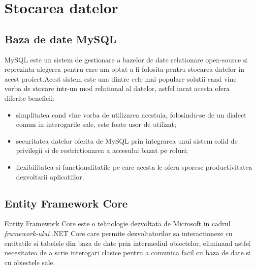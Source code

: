 \section{Stocarea datelor}

 \subsection*{Baza de date MySQL}
	MySQL este un sistem de gestionare a bazelor de date relationare open-source si reprezinta alegerea pentru care am optat a fi folosita pentru stocarea datelor in acest proiect.Acest sistem este una dintre cele mai populare solutii cand vine vorba de stocare intr-un mod relational al datelor, astfel incat acesta ofera diferite beneficii: 
	\begin{itemize}
		
		\item simplitatea cand vine vorba de utilizarea acestuia, folosindu-se de un dialect comun in interogarile sale, este foate usor de utilizat;
		
		\item securitatea datelor oferita de MySQL prin integrarea unui sistem solid de privilegii si de restrictionarea a accesului bazat pe roluri;
		
		\item flexibilitatea si functionalitatile pe care acesta le ofera sporesc productivitatea dezvoltarii aplicatiilor.
	\end{itemize} 
 
 \subsection*{Entity Framework Core}
Entity Framework Core este o tehnologie dezvoltata de Microsoft in cadrul \textit{framework-ului} .NET Core care permite dezvoltatorilor sa interactioneze cu entitatile si tabelele din baza de date prin intermediul obiectelor, eliminand astfel necesitatea de a scrie interogari clasice pentru a comunica facil cu baza de date si cu obiectele sale.

